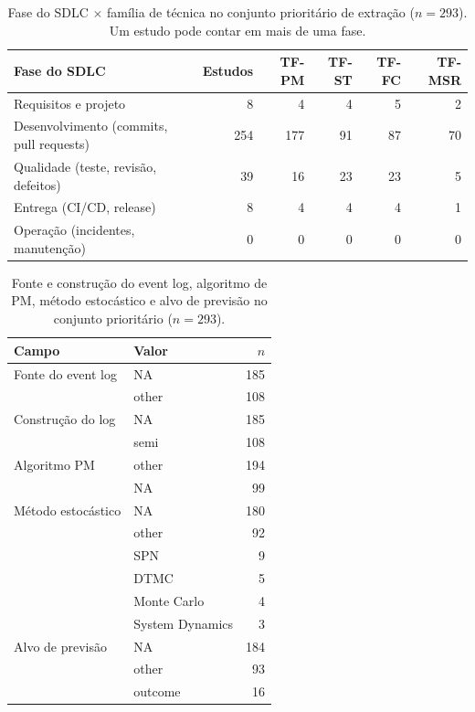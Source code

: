 \documentclass[preprint,12pt,authoryear=false]{elsarticle}
\newcommand{\PM}{TF-PM}
\newcommand{\ST}{TF-ST}
\newcommand{\FC}{TF-FC}
\newcommand{\MSR}{TF-MSR}
\begin{document}
\begin{table}[t]
\centering\small
\caption{Fase do SDLC $\times$ família de técnica no conjunto prioritário de extração ($n = 293$). Um estudo pode contar em mais de uma fase.}
\label{tab:rq3-sdlc}
\begin{tabular}{lrrrrr}
\toprule
Fase do SDLC & Estudos & \PM{} & \ST{} & \FC{} & \MSR{} \\
\midrule
Requisitos e projeto & 8 & 4 & 4 & 5 & 2 \\
Desenvolvimento (commits, pull requests) & 254 & 177 & 91 & 87 & 70 \\
Qualidade (teste, revisão, defeitos) & 39 & 16 & 23 & 23 & 5 \\
Entrega (CI/CD, release) & 8 & 4 & 4 & 4 & 1 \\
Operação (incidentes, manutenção) & 0 & 0 & 0 & 0 & 0 \\
\bottomrule
\end{tabular}
\end{table}

\begin{table}[t]
\centering\small
\caption{Fonte e construção do event log, algoritmo de PM, método estocástico e alvo de previsão no conjunto prioritário ($n = 293$).}
\label{tab:rq3-tech}
\footnotesize
\begin{tabular}{llr}
\toprule
Campo & Valor & $n$ \\
\midrule
Fonte do event log & NA & 185 \\
 & other & 108 \\
Construção do log & NA & 185 \\
 & semi & 108 \\
Algoritmo PM & other & 194 \\
 & NA & 99 \\
Método estocástico & NA & 180 \\
 & other & 92 \\
 & SPN & 9 \\
 & DTMC & 5 \\
 & Monte Carlo & 4 \\
 & System Dynamics & 3 \\
Alvo de previsão & NA & 184 \\
 & other & 93 \\
 & outcome & 16 \\
\bottomrule
\end{tabular}
\end{table}
\end{document}
